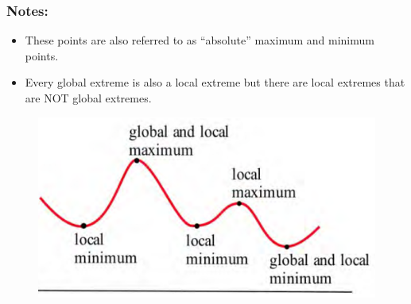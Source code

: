 \subsubsection*{Notes:}
\begin{itemize}
    \item These points are also referred to as “absolute” maximum and minimum points.
    \item Every global extreme is also a local extreme but there are local extremes that are NOT global extremes.
\end{itemize}
\vspace{-0.5cm}
\begin{figure}[h]
    \centering
    \caption{} 
    \includegraphics[scale=0.4]{images/optimization/globalVSlocalExtrema.png} 
    \label{fig:globalVSlocalExtrema}
\end{figure}

